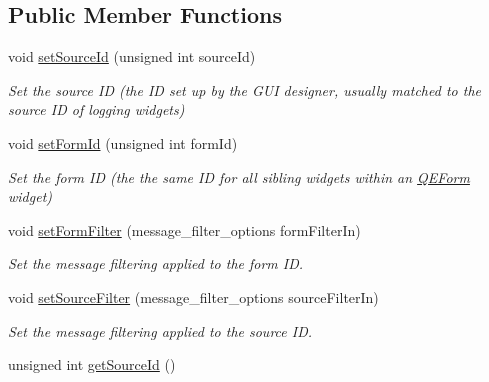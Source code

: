 \subsection*{Public Member Functions}
\begin{DoxyCompactItemize}
\item 
\hypertarget{classUserMessage_a5d476c21b7cdcbda62a96574621396d5}{
void \hyperlink{classUserMessage_a5d476c21b7cdcbda62a96574621396d5}{setSourceId} (unsigned int sourceId)}
\label{classUserMessage_a5d476c21b7cdcbda62a96574621396d5}

\begin{DoxyCompactList}\small\item\em Set the source ID (the ID set up by the GUI designer, usually matched to the source ID of logging widgets) \end{DoxyCompactList}\item 
\hypertarget{classUserMessage_a91478faf00973a0c7b72efbfe541dcec}{
void \hyperlink{classUserMessage_a91478faf00973a0c7b72efbfe541dcec}{setFormId} (unsigned int formId)}
\label{classUserMessage_a91478faf00973a0c7b72efbfe541dcec}

\begin{DoxyCompactList}\small\item\em Set the form ID (the the same ID for all sibling widgets within an \hyperlink{classQEForm}{QEForm} widget) \end{DoxyCompactList}\item 
\hypertarget{classUserMessage_ab39f79176c4a73da0df22c177f7d9c26}{
void \hyperlink{classUserMessage_ab39f79176c4a73da0df22c177f7d9c26}{setFormFilter} (message\_\-filter\_\-options formFilterIn)}
\label{classUserMessage_ab39f79176c4a73da0df22c177f7d9c26}

\begin{DoxyCompactList}\small\item\em Set the message filtering applied to the form ID. \end{DoxyCompactList}\item 
\hypertarget{classUserMessage_a1e0fb779943de9904a006f6130eb597c}{
void \hyperlink{classUserMessage_a1e0fb779943de9904a006f6130eb597c}{setSourceFilter} (message\_\-filter\_\-options sourceFilterIn)}
\label{classUserMessage_a1e0fb779943de9904a006f6130eb597c}

\begin{DoxyCompactList}\small\item\em Set the message filtering applied to the source ID. \end{DoxyCompactList}\item 
\hypertarget{classUserMessage_a900c499564c8c48dba1c7dd2ab53bf41}{
unsigned int \hyperlink{classUserMessage_a900c499564c8c48dba1c7dd2ab53bf41}{getSourceId} ()}
\label{classUserMessage_a900c499564c8c48dba1c7dd2ab53bf41}


\end{DoxyCompactItemize}
